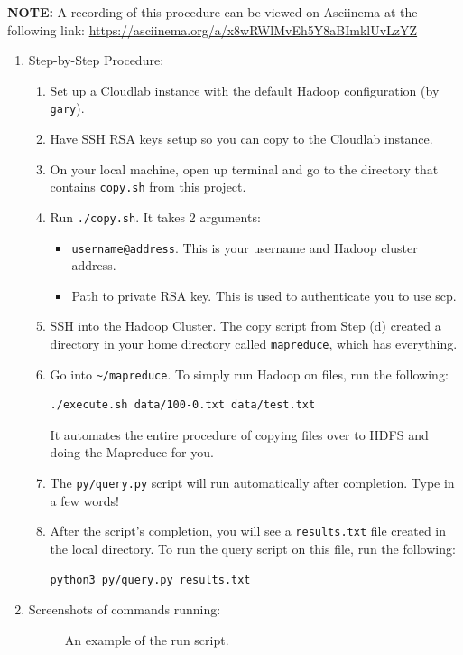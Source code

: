 \textbf{NOTE:} A recording of this procedure can be viewed on Asciinema at the following link: \url{https://asciinema.org/a/x8wRWlMvEh5Y8aBImklUvLzYZ}
\begin{enumerate}
    \item Step-by-Step Procedure:
        \begin{enumerate}
            \item Set up a Cloudlab instance with the default Hadoop configuration (by \lstinline{gary}).
            \item Have SSH RSA keys setup so you can copy to the Cloudlab instance.
            \item On your local machine, open up terminal and go to the directory that contains \lstinline{copy.sh} from this project.
            \item Run \lstinline{./copy.sh}. It takes 2 arguments:
                \begin{itemize}
                    \item \lstinline{username@address}. This is your username and Hadoop cluster address.
                    \item Path to private RSA key. This is used to authenticate you to use scp.
                \end{itemize}
            \item SSH into the Hadoop Cluster. The copy script from Step (d) created a directory in your home directory called \lstinline{mapreduce}, which has everything.
            \item Go into \lstinline{~/mapreduce}. To simply run Hadoop on files, run the following: \begin{verbatim}./execute.sh data/100-0.txt data/test.txt\end{verbatim} It automates the entire procedure of copying files over to HDFS and doing the Mapreduce for you.
            \item The \lstinline{py/query.py} script will run automatically after completion. Type in a few words!
            \item After the script's completion, you will see a \lstinline{results.txt} file created in the local directory. To run the query script on this file, run the following: \begin{verbatim}python3 py/query.py results.txt\end{verbatim}
           \end{enumerate}
    \item Screenshots of commands running: \\
    
\begin{figure}[!htbp] 
  \caption{An example of the run script.}
\end{figure}

\end{enumerate}